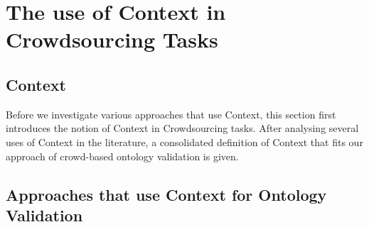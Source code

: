 \section{The use of Context in Crowdsourcing Tasks}
% 

\subsection{Context}
Before we investigate various approaches that use Context, this section first introduces the notion of Context in Crowdsourcing
tasks. After analysing several uses of Context in the literature, a consolidated definition of Context that fits our approach of crowd-based ontology validation is given.

\subsection{Approaches that use Context for Ontology Validation}
